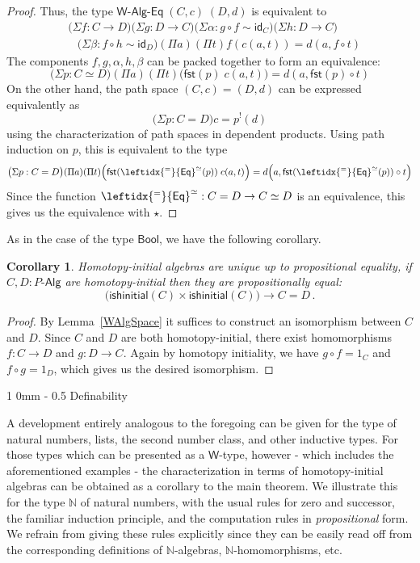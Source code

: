 \documentclass[reqno,10pt,a4paper,oneside]{amsart}
\makeatletter
\numberwithin{equation}{section}
\renewcommand{\section}{\@startsection
  {section}%
   {1}%
  {0mm}%
   {-\baselineskip}%
  {0.5\baselineskip}%
   {\Large\bfseries}}%
\theoremstyle{mythm}
\newtheorem{corollary}[theorem]{Corollary}
\theoremstyle{mydef}
\theoremstyle{myrmk}
\newcommand{\ie}{\text{i.e.\ }}
\newcommand{\idfun}[1]{\mathsf{id}_{#1}}
\newcommand{\comp}{\circ}
\newcommand{\idtoeq}{\leftidx{^=}{\mathsf{Eq}}^{\simeq}}
\newcommand{\fst}{\mathsf{fst}}
\newcommand{\nat}{\ensuremath{\mathbb{N}}}
\newcommand{\W}{\mathsf{W}}
\newcommand{\Bool}{\mathsf{Bool}}
\newcommand{\Palg}{P\text{-}\mathsf{Alg}}
\newcommand{\WAlgIso}{\mathsf{W}\text{-}\mathsf{Alg}\text{-}\mathsf{Eq}}
\makeatother
\begin{document}
\begin{proof}
Thus, the type $\WAlgIso \; (C,c) \; (D,d)$ is equivalent to
\begin{align*}
& \big(\Sigma f : C\to D \big) \big(\Sigma g:D\to C\big) \big( \Sigma \alpha : g \comp f \sim \idfun{C}\big) \big(\Sigma h:D \to C\big) \\ & \;\;\; \big(\Sigma \beta : f \comp h \sim \idfun{D}\big) (\Pi a) (\Pi t) f(c(a,t)) = d(a,f \comp t)
\end{align*}
The components $f,g,\alpha,h,\beta$ can be packed together to form an equivalence:
\[ \big(\Sigma p : C \simeq D\big) (\Pi a) (\Pi t) \big(\fst(p) \; c(a,t)\big) = d(a, \fst(p) \comp t) \tag{$\star$} \]
On the other hand, the path space $(C,c) = (D,d)$ can be expressed equivalently as
\[  \big(\Sigma p : C = D\big) c = p^{!}(d) \]
using the characterization of path spaces in dependent products. Using path induction on $p$, this is equivalent to the type
\[  \big(\Sigma p : C = D\big) (\Pi a) (\Pi t) \Big(\fst(\idtoeq(p)) \; c(a,t)\Big) = d\Big(a, \fst(\idtoeq(p)) \comp t\Big) \]
Since the function $\idtoeq : C = D \to C \simeq D$ is an equivalence, this gives us the equivalence with $\star$.
\end{proof}


As in the case of the type $\Bool$, we have the following corollary.


\begin{corollary}\label{WHInitIso}
Homotopy-initial algebras are unique up to propositional equality, \ie 
if $C, D : \Palg$ are homotopy-initial then they are propositionally equal:
\[ 
\big( \mathsf{ishinitial}(C) \times \mathsf{ishinitial}(C) \big) \to C = D \, .
\] 
\end{corollary}

\begin{proof}
By Lemma~\ref{WAlgSpace} it suffices to construct an isomorphism between $C$ and $D$. Since $C$ and $D$ are both homotopy-initial, there exist homomorphisms $f :  C \to D$ and $g : D \to C$. Again by homotopy initiality, we have $g \comp f = 1_C$ and $f \comp g = 1_D$, which gives us the desired isomorphism.
\end{proof}

\section{Definability}
\label{sec:definability}

A development entirely analogous to the foregoing can be given for the type of natural numbers, lists, the second number class, and other inductive types. For those types which can be presented as a $\W$-type, however - which includes the aforementioned examples - the characterization in terms of homotopy-initial algebras can be obtained as a corollary to the main theorem. We illustrate this for the type $\nat$ of natural numbers, with the usual rules for zero and successor, the familiar induction principle, and the computation rules in \emph{propositional} form. We refrain from giving these rules explicitly since they can be easily read off from the corresponding definitions of $\nat$-algebras, $\nat$-homomorphisms, etc.
\end{document}
